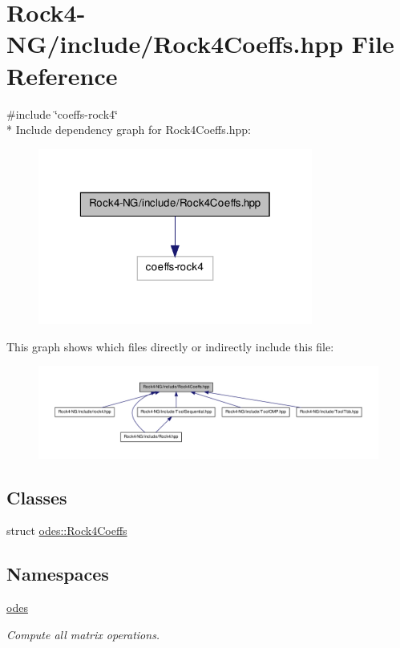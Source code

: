 \hypertarget{Rock4-NG_2include_2Rock4Coeffs_8hpp}{\section{Rock4-\/\-N\-G/include/\-Rock4\-Coeffs.hpp File Reference}
\label{Rock4-NG_2include_2Rock4Coeffs_8hpp}
}
{\ttfamily \#include \char`\"{}coeffs-\/rock4\char`\"{}}\\*
Include dependency graph for Rock4\-Coeffs.\-hpp\-:
\nopagebreak
\begin{figure}[H]
\begin{center}
\leavevmode
\includegraphics[width=256pt]{Rock4-NG_2include_2Rock4Coeffs_8hpp__incl}
\end{center}
\end{figure}
This graph shows which files directly or indirectly include this file\-:
\nopagebreak
\begin{figure}[H]
\begin{center}
\leavevmode
\includegraphics[width=350pt]{Rock4-NG_2include_2Rock4Coeffs_8hpp__dep__incl}
\end{center}
\end{figure}
\subsection*{Classes}
\begin{DoxyCompactItemize}
\item 
struct \hyperlink{structodes_1_1Rock4Coeffs}{odes\-::\-Rock4\-Coeffs}
\end{DoxyCompactItemize}
\subsection*{Namespaces}
\begin{DoxyCompactItemize}
\item 
\hyperlink{namespaceodes}{odes}
\begin{DoxyCompactList}\small\item\em Compute all matrix operations. \end{DoxyCompactList}\end{DoxyCompactItemize}
